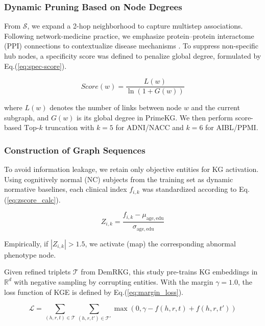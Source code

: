 \documentclass[lettersize,journal]{IEEEtran}
\begin{document}
\subsubsection{Dynamic Pruning Based on Node Degrees}

    From $\mathcal{S}$, we expand a 2-hop neighborhood to capture multistep associations. Following network-medicine practice, we emphasize protein--protein interactome (PPI) connections to contextualize disease mechanisms \cite{barabasi2011network,cheng2019network}. To suppress non-specific hub nodes, a specificity score was defined to penalize global degree, formulated by Eq.(\ref{eq:spec-score}).

    \begin{equation}
        Score(w) = \frac{L(w)}{\ln(1 + G(w))}
        \label{eq:spec-score}
    \end{equation}

    where $L(w)$ denotes the number of links between node $w$ and the current subgraph, and $G(w)$ is its global degree in PrimeKG. We then perform score-based $\mathrm{Top}\text{-}k$ truncation with $k=5$ for ADNI/NACC and $k=6$ for AIBL/PPMI.

\subsubsection{Construction of Graph Sequences}

    To avoid information leakage, we retain only objective entities for KG activation. Using cognitively normal (NC) subjects from the training set as dynamic normative baselines, each clinical index $f_{i,k}$ was standardized according to Eq.(\ref{eq:zscore_calc}).
    
    \begin{equation}
        Z_{i, k} = \frac{f_{i, k} - \mu_{\mathrm{age}, \mathrm{edu}}}{\sigma_{\mathrm{age}, \mathrm{edu}}}
    \label{eq:zscore_calc}
    \end{equation}

    Empirically, if $|Z_{i,k}|>1.5$, we activate (map) the corresponding abnormal phenotype node.

    Given refined triplets $\mathcal{T}$ from DemRKG, this study pre-trains KG embeddings in $\mathbb{R}^d$ with negative sampling by corrupting entities. With the margin $\gamma=1.0$, the loss function of KGE is defined by Eq.(\ref{eq:margin_loss}).
    
    \begin{equation}
        \mathcal{L} = \sum_{(h, r, t) \in \mathcal{T}} \sum_{(h, r, t') \in \mathcal{T}'} \max(0, \gamma - f(h, r, t) + f(h, r, t'))
        \label{eq:margin_loss}
    \end{equation}
\end{document}
